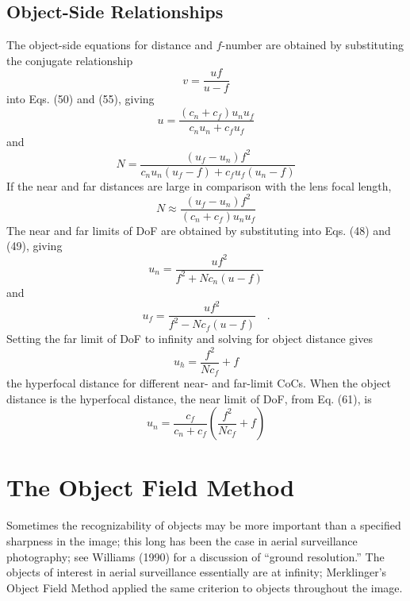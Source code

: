 \documentclass[11pt, oneside]{scrartcl}   	%
\begin{document}
\subsection{Object-Side Relationships}
\label{sec:object-side-relat}


The object-side equations for distance and $f$-number are obtained by
substituting the conjugate relationship
\begin{equation}
  \label{eq:57+++++}
  v=\frac{uf}{u-f}
\end{equation}
into Eqs. (50) and (55), giving
\begin{equation}
  \label{eq:58}
  u = \frac{(c_n+c_f)u_nu_f}{c_nu_n+c_fu_f}
\end{equation}
and
\begin{equation}
  \label{eq:59}
  N=\frac{(u_f-u_n)f^2}{c_nu_n(u_f-f)+c_fu_f(u_n-f)}
\end{equation}
If the near and far distances are large in comparison with the lens
focal length,
\begin{equation}
  \label{eq:1}
  N\approx\frac{(u_f-u_n)f^2}{(c_n+c_f)u_nu_f}
\end{equation}
The near and far limits of DoF are obtained by substituting  into
Eqs. (48) and (49), giving
\begin{equation}
  \label{eq:61}
  u_n=\frac{uf^2}{f^2+N\!c_n(u-f)}
\end{equation}
and
\begin{equation}
  \label{eq:62}
  u_f=\frac{uf^2}{f^2-N\!c_f(u-f)}\quad.
\end{equation}
Setting the far limit of DoF to infinity and solving for object
distance gives
\begin{equation}
  \label{eq:uh}
  u_h=\frac{f^2}{N\!c_f}+f
\end{equation}
the hyperfocal distance for different near- and far-limit CoCs. When
the object distance is the hyperfocal distance, the near limit of DoF,
from Eq. (61), is
\begin{equation}
  \label{eq:un}
  u_n = \frac{c_f}{c_n+c_f}\left(\frac{f^2}{N\!c_f}+f\right)
\end{equation}

\section{The Object Field Method}
\label{sec:object-field-method}


Sometimes the recognizability of objects may be more important than a specified sharpness in the image; this long has been the case in aerial surveillance photography; see Williams (1990) for a discussion of “ground resolution.” The objects of interest in aerial surveillance essentially are at infinity; Merklinger’s Object Field Method applied the same criterion to objects throughout the image.
\end{document}
